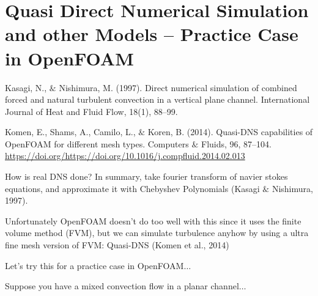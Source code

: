 \documentclass[12pt]{article}
\renewcommand{\_}{\kern-1.5pt\textunderscore\kern-1.5pt}
\begin{document}
\vspace{\baselineskip}



\part{Quasi Direct Numerical Simulation and other Models – Practice Case in OpenFOAM}
Kasagi, N., $\&$  Nishimura, M. (1997). Direct numerical simulation of combined forced and natural turbulent convection in a vertical plane channel. International Journal of Heat and Fluid Flow, 18(1), 88–99.\par

Komen, E., Shams, A., Camilo, L., $\&$  Koren, B. (2014). Quasi-DNS capabilities of OpenFOAM for different mesh types. Computers $\&$  Fluids, 96, 87–104. \href{https://doi.org/https://doi.org/10.1016/j.compfluid.2014.02.013}{https://doi.org/https://doi.org/10.1016/j.compfluid.2014.02.013}\par


\vspace{\baselineskip}
How is real DNS done? In summary, take fourier transform of navier stokes equations, and approximate it with Chebyshev Polynomials (Kasagi $\&$  Nishimura, 1997).\par


\vspace{\baselineskip}
Unfortunately OpenFOAM doesn’t do too well with this since it uses the finite volume method (FVM), but we can simulate turbulence anyhow by using a ultra fine mesh version of FVM: Quasi-DNS (Komen et al., 2014)\par


\vspace{\baselineskip}
Let’s try this for a practice case in OpenFOAM$ \ldots $ \par

Suppose you have a mixed convection flow in a planar channel$ \ldots $ \par
\end{document}

